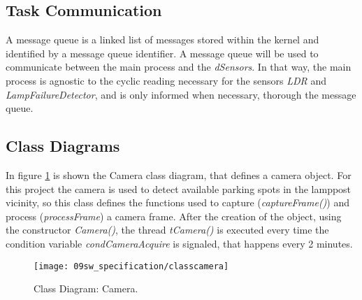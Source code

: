 \subsection{Task Communication}
%
%


A message queue is a linked list of messages stored within the kernel and identified by a message queue identifier. A message queue will be used to communicate between the main process and the \textit{dSensors}. In that way, the main process is agnostic to the cyclic reading necessary for the sensors \textit{LDR} and \textit{LampFailureDetector}, and is only informed when necessary, thorough the message queue.

\subsection{Class Diagrams}

In figure \ref{fig:classcamera} is shown the Camera class diagram, that defines a camera object.  For this project the camera is used to detect available parking spots in the lamppost vicinity, so this class defines the functions used to capture (\textit{captureFrame()}) and process (\textit{processFrame}) a camera frame. After the creation of the object, using the constructor \textit{Camera()}, the thread \textit{tCamera()} is executed every time the condition variable \textit{condCameraAcquire} is signaled, that happens every 2 minutes.


\begin{figure}[H]
	\centering
	\texttt{[image: 09sw\_specification/classcamera]}
	\caption{Class Diagram: Camera.}
	\label{fig:classcamera}
\end{figure}

